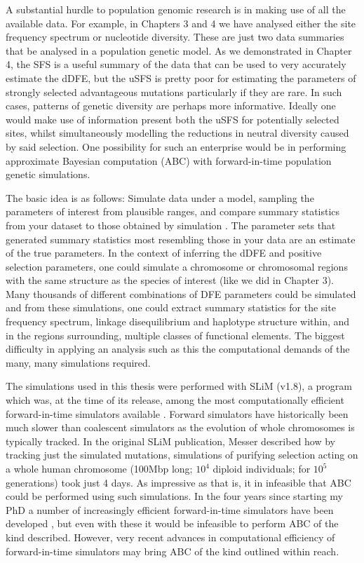 A substantial hurdle to population genomic research is in making use of all the available data. For example, in Chapters 3 and 4 we have analysed either the site frequency spectrum or nucleotide diversity. These are just two data summaries that be analysed in a population genetic model. As we demonstrated in Chapter 4, the SFS is a useful summary of the data that can be used to very accurately estimate the dDFE, but the uSFS is pretty poor for estimating the parameters of strongly selected advantageous mutations particularly if they are rare. In such cases, patterns of genetic diversity are perhaps more informative. Ideally one would make use of information present both the uSFS for potentially selected sites, whilst simultaneously modelling the reductions in neutral diversity caused by said selection. One possibility for such an enterprise would be in performing approximate Bayesian computation (ABC) with forward-in-time population genetic simulations.

The basic idea is as follows: Simulate data under a model, sampling the parameters of interest from  plausible ranges, and compare summary statistics from your dataset to those obtained by simulation \citep{RN356}. The parameter sets that generated summary statistics most resembling those in your data are an estimate of the true parameters. In the context of inferring the dDFE and positive selection parameters, one could simulate a chromosome or chromosomal regions with the same structure as the species of interest (like we did in Chapter 3). Many thousands of different combinations of DFE parameters could be simulated and from these simulations, one could extract summary statistics for the site frequency spectrum, linkage disequilibrium and haplotype structure within, and in the regions surrounding, multiple classes of functional elements. The biggest difficulty in applying an analysis such as this the computational demands of the many, many simulations required.

The simulations used in this thesis were performed with SLiM (v1.8), a program which was, at the time of its release, among the most computationally efficient forward-in-time simulators available \cite{RN148}. Forward simulators have historically been much slower than coalescent simulators as the evolution of whole chromosomes is typically tracked. In the original SLiM publication, Messer described how by tracking just the simulated mutations, simulations of purifying selection acting on a whole human chromosome (100Mbp long; $10^4$ diploid individuals; for $10^5$ generations) took just 4 days. As impressive as that is, it in infeasible that ABC could be performed using such simulations. In the four years since starting my PhD a number of increasingly efficient forward-in-time simulators have been developed \citep{RN362, RN360, RN361}, but even with these it would be infeasible to perform ABC of the kind described. However, very recent advances in computational efficiency of forward-in-time simulators \citep{RN359} may bring ABC of the kind outlined within reach.




